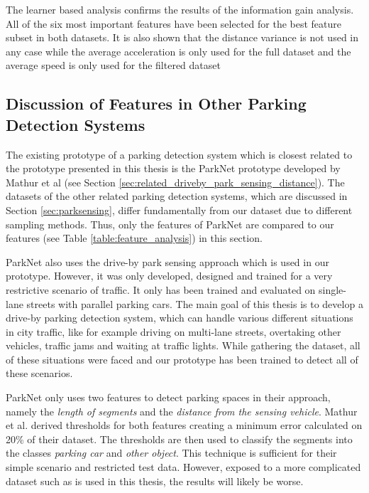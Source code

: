 The learner based analysis confirms the results of the information gain analysis. All of the six most important features have been selected for the best feature subset in both datasets. It is also shown that the distance variance is not used in any case while the average acceleration is only used for the full dataset and the average speed is only used for the filtered dataset






\subsection{Discussion of Features in Other Parking Detection Systems}

The existing prototype of a parking detection system which is closest related to the prototype presented in this thesis is the ParkNet prototype developed by Mathur et al \cite{Mathur:2010:PDS:1814433.1814448} (see Section \ref{sec:related_driveby_park_sensing_distance}). The datasets of the other related parking detection systems, which are discussed in Section \ref{sec:parksensing}, differ fundamentally from our dataset due to different sampling methods. Thus, only the features of ParkNet are compared to our features (see Table \ref{table:feature_analysis}) in this section.

ParkNet also uses the drive-by park sensing approach which is used in our prototype. 
However, it was only developed, designed and trained for a very restrictive scenario of traffic. It only has been trained and evaluated on single-lane streets with parallel parking cars.
The main goal of this thesis is to develop a drive-by parking detection system, which can handle various different situations in city traffic, like for example driving on multi-lane streets, overtaking other vehicles, traffic jams and waiting at traffic lights. While gathering the dataset, all of these situations were faced and our prototype has been trained to detect all of these scenarios.

ParkNet only uses two features to detect parking spaces in their approach, namely the \emph{length of segments} and the \emph{distance from the sensing vehicle}. Mathur et al. derived thresholds for both features creating a minimum error calculated on 20\% of their dataset. The thresholds are then used to classify the segments into the classes \emph{parking car} and \emph{other object}. This technique is sufficient for their simple scenario and restricted test data. However, exposed to a more complicated dataset such as is used in this thesis, the results will likely be worse.

